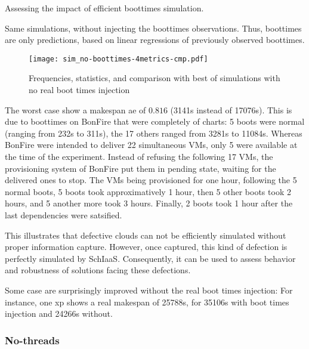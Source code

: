 {Assessing the impact of efficient boottimes simulation.

Same simulations, without injecting the boottimes observations. 
Thus, boottimes are only predictions, based on linear regressions of previously
observed boottimes.

\begin{figure}
  \centering
  \texttt{[image: sim\_no-boottimes-4metrics-cmp.pdf]}

  

  

  

  \caption{Frequencies, statistics, and comparison with best of simulations with no real boot times 
  injection}

\end{figure} 

The worst case show a makespan ae of $0.816$ (3141s instead of 17076s). 
This is due to boottimes on BonFire that were completely of charts: 
5 boots were normal (ranging from 232s to 311s), 
the 17 others ranged from 3281s to 11084s.
Whereas BonFire were intended to deliver 22 simultaneous VMs, only 5 were available
at the time of the experiment. Instead of refusing the following 17 VMs, the
provisioning system of BonFire put them in pending state, waiting for the delivered
ones to stop. The VMs being provisioned for one hour, following the 5 normal boots, 
5 boots took approximatively 1 hour, then 5 other boots took 2 hours,
and 5 another more took 3 hours. Finally, 2 boots took 1 hour after the last 
dependencies were satsified.

This illustrates that defective clouds can not be efficiently simulated without 
proper information capture. However, once captured, this kind of defection is
perfectly simulated by SchIaaS. Consequently, it can be used to assess behavior 
and robustness of solutions facing these defections.

Some case are surprisingly improved without the real boot times injection:
For instance, one xp shows a real makespan of 25788s, for 35106s with boot times
injection and 24266s without. 




\subsubsection{No-threads}

}

